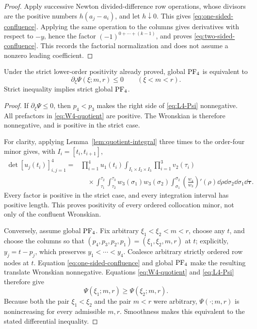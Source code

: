 \begin{proof}
Apply successive Newton divided-difference row operations, whose divisors
are the positive numbers \(h(a_j-a_i)\), and let \(h\downarrow0\). This gives
\eqref{eq:one-sided-confluence}. Applying the same operation to the columns
gives derivatives with respect to \(-y\), hence the factor
\((-1)^{0+\cdots+(k-1)}\), and proves
\eqref{eq:two-sided-confluence}. This records the factorial normalization and
does not assume a nonzero leading coefficient.
\end{proof}

\begin{proposition}\label{prop:equivalence}
Under the strict lower-order positivity already proved, global \(\mathrm{PF}_4\) is
equivalent to
\[
 \partial_\xi\Psi(\xi;m,r)\leq0\qquad(\xi<m<r).
\]
Strict inequality implies strict global \(\mathrm{PF}_4\).
\end{proposition}

\begin{proof}
If \(\partial_\xi\Psi\leq0\), then \(p_4<p_3\) makes the right side of
\eqref{eq:L4-Psi} nonnegative. All prefactors in
\eqref{eq:W4-quotient} are positive. The Wronskian is therefore
nonnegative, and is positive in the strict case.

For clarity, applying Lemma~\ref{lem:quotient-integral} three times to the
order-four minor gives, with \(I_i=[t_i,t_{i+1}]\),
\begin{align*}
\det[u_j(t_i)]_{i,j=1}^4
={}&\prod_{i=1}^4u_1(t_i)
\int_{I_1\times I_2\times I_3}\prod_{i=1}^3v_2(\tau_i)\\
&\quad\times\int_{\tau_1}^{\tau_2}\int_{\tau_2}^{\tau_3}
w_3(\sigma_1)w_3(\sigma_2)
\int_{\sigma_1}^{\sigma_2}
\left(\frac{w_4}{w_3}\right)'(\rho)\dd\rho
\dd\sigma_2\dd\sigma_1\dd\boldsymbol\tau.
\end{align*}
Every factor is positive in the strict case, and every integration interval
has positive length. This proves positivity of every ordered collocation minor,
not only of the confluent Wronskian.

Conversely, assume global \(\mathrm{PF}_4\). Fix arbitrary
\(\xi_1<\xi_2<m<r\), choose any \(t\), and choose the columns so that
\((p_4,p_3,p_2,p_1)=(\xi_1,\xi_2,m,r)\) at \(t\); explicitly,
\(y_j=t-p_j\), which preserves \(y_1<\cdots<y_4\). Coalesce arbitrary
strictly ordered row nodes at \(t\). Equation
\eqref{eq:one-sided-confluence} and global \(\mathrm{PF}_4\) make the resulting
translate Wronskian nonnegative. Equations \eqref{eq:W4-quotient} and
\eqref{eq:L4-Psi} therefore give
\[
 \Psi(\xi_1;m,r)\geq\Psi(\xi_2;m,r).
\]
Because both the pair \(\xi_1<\xi_2\) and the pair \(m<r\) were arbitrary,
\(\Psi(\cdot;m,r)\) is nonincreasing for every admissible \(m,r\). Smoothness
makes this equivalent to the stated differential inequality.
\end{proof}
